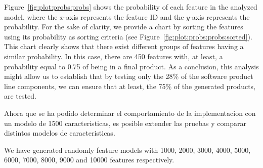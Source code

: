 Figure~\ref{fig:plot:probs:probs} shows the probability of each feature in the analyzed model, where the $x$-axis
represents the feature ID and the $y$-axis represents the probability. For the sake of clarity, we provide a chart by sorting the features using its probability as sorting criteria (see Figure~\ref{fig:plot:probs:probs:sorted}).
This chart clearly shows that there exist different groups of features having a similar probability.
%
In this case, there are 450 features with, at least, a probability equal to 0.75 of being in a final product. As a conclusion,
this analysis might allow us to establish that by testing only the 28\% of the software product line components, we can ensure that
at least, the 75\% of the generated products, are tested.



Ahora que se ha podido determinar el comportamiento
de la implementacion con un modelo de 1500 caracteristicas, es
posible extender las pruebas y comparar distintos modelos
de caracteristicas.

We have generated randomly feature models with 1000, 2000, 3000, 4000, 5000, 6000, 7000, 8000, 9000 and 10000 features respectively.


